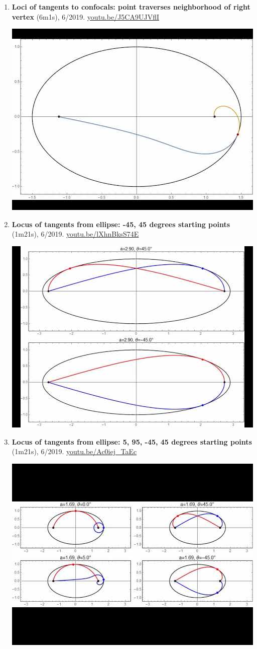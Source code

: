\documentclass[12pt]{article}
\begin{document}
\begin{enumerate}[resume]
% 
\item \textbf{Loci of tangents to confocals: point traverses neighborhood of right vertex} (6m1s), 6/2019. \href{https://youtu.be/J5CA9UJVflI}{\url{youtu.be/J5CA9UJVflI}}
\begin{center}\includegraphics[width=.5\textwidth]{pics/J5CA9UJVflI.jpg}\end{center}
% 
\item \textbf{Locus of tangents from ellipse: -45, 45 degrees starting points} (1m21s), 6/2019. \href{https://youtu.be/lXhnBksS74E}{\url{youtu.be/lXhnBksS74E}}
\begin{center}\includegraphics[width=.5\textwidth]{pics/lXhnBksS74E.jpg}\end{center}
% 
\item \textbf{Locus of tangents from ellipse: 5, 95, -45, 45 degrees starting points} (1m21s), 6/2019. \href{https://youtu.be/Ac0iej_TaEc}{\url{youtu.be/Ac0iej\_TaEc}}
\begin{center}\includegraphics[width=.5\textwidth]{pics/Ac0iej_TaEc.jpg}\end{center}
% 
\end{enumerate}
\end{document}
